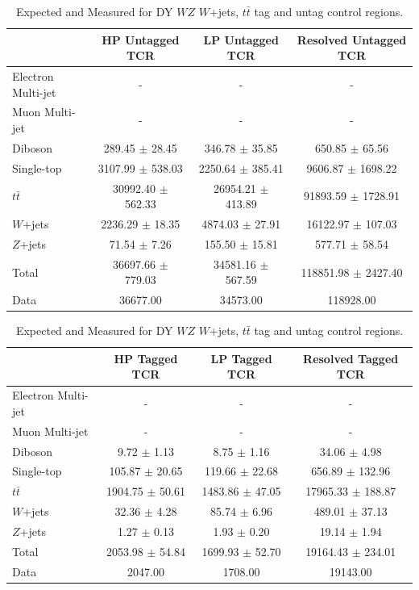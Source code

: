\begin{table}
\begin{tabular}{|l|c|c|c|}
\hline
	  &	 HP Untagged TCR &	 LP Untagged TCR &	Resolved Untagged TCR \\\hline 
	Electron Multi-jet &	- &	- &	- \\\hline 
	Muon Multi-jet &	- &	- &	- \\\hline 
	Diboson &	289.45 $\pm$ 28.45 &	346.78 $\pm$ 35.85 &	650.85 $\pm$ 65.56 \\\hline 
	Single-top &	3107.99 $\pm$ 538.03 &	2250.64 $\pm$ 385.41 &	9606.87 $\pm$ 1698.22 \\\hline 
	$t\bar{t}$ &	30992.40 $\pm$ 562.33 &	26954.21 $\pm$ 413.89 &	91893.59 $\pm$ 1728.91 \\\hline 
	$W$+jets &	2236.29 $\pm$ 18.35 &	4874.03 $\pm$ 27.91 &	16122.97 $\pm$ 107.03 \\\hline 
	$Z$+jets &	71.54 $\pm$ 7.26 &	155.50 $\pm$ 15.81 &	577.71 $\pm$ 58.54 \\\hline 
	Total &	36697.66 $\pm$ 779.03 &	34581.16 $\pm$ 567.59 &	118851.98 $\pm$ 2427.40 \\\hline 
	Data &	36677.00 &	34573.00 &	118928.00 \\\hline 
\end{tabular}

\begin{tabular}{|l|c|c|c|}
\hline
	  &	 HP Tagged TCR &	 LP Tagged TCR &	Resolved Tagged TCR \\\hline 
	Electron Multi-jet &	- &	- &	- \\\hline 
	Muon Multi-jet &	- &	- &	- \\\hline 
	Diboson &	9.72 $\pm$ 1.13 &	8.75 $\pm$ 1.16 &	34.06 $\pm$ 4.98 \\\hline 
	Single-top &	105.87 $\pm$ 20.65 &	119.66 $\pm$ 22.68 &	656.89 $\pm$ 132.96 \\\hline 
	$t\bar{t}$ &	1904.75 $\pm$ 50.61 &	1483.86 $\pm$ 47.05 &	17965.33 $\pm$ 188.87 \\\hline 
	$W$+jets &	32.36 $\pm$ 4.28 &	85.74 $\pm$ 6.96 &	489.01 $\pm$ 37.13 \\\hline 
	$Z$+jets &	1.27 $\pm$ 0.13 &	1.93 $\pm$ 0.20 &	19.14 $\pm$ 1.94 \\\hline 
	Total &	2053.98 $\pm$ 54.84 &	1699.93 $\pm$ 52.70 &	19164.43 $\pm$ 234.01 \\\hline 
	Data &	2047.00 &	1708.00 &	19143.00 \\\hline 
\end{tabular}


\caption{Expected and Measured for DY $WZ$ $W$+jets, $t\bar{t}$ tag and untag control regions.}
\label{tbl:hvtwz_yields_cr}
\end{table}

